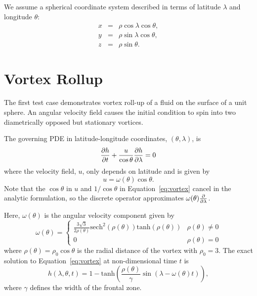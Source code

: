 \documentclass{report}
\begin{document}
We assume a spherical coordinate system described in terms of latitude $\lambda$ and longitude $\theta$:
\begin{eqnarray*} 
x & = & \rho \cos \lambda \cos \theta, 	\\
y & = & \rho \sin \lambda \cos \theta, 		\\
z & = & \rho \sin \theta.		
\end{eqnarray*}


\section{Vortex Rollup}
\label{sec:vortex_rollup}

The first test case demonstrates vortex roll-up of a fluid on the surface of a unit sphere. An angular velocity field causes the initial condition to spin into two diametrically opposed but stationary vortices.

The governing PDE in latitude-longitude coordinates, $(\theta,\lambda)$, is
\begin{equation}
\frac{\partial h}{\partial t} + \frac{u}{\cos \theta} \frac{\partial h}{\partial \lambda} = 0
\label{eq:vortex}
\end{equation}
where the velocity field, $u$, only depends on latitude and is given by
\begin{equation*}
u  = \omega(\theta) \cos \theta.
\end{equation*}
Note that the $\cos \theta$ in $u$ and $1/\cos{\theta}$ in Equation~\ref{eq:vortex} cancel in the analytic formulation, so the discrete operator approximates $\omega(\theta) \frac{\partial }{\partial \lambda}$. 

Here, $\omega(\theta)$ is the angular velocity component given by
\begin{equation*}
\omega(\theta) =
\begin{cases}
\frac{3\sqrt{3}}{2 \rho(\theta)} \mathrm{sech}^{2}(\rho(\theta)) \mathrm{tanh}(\rho(\theta)) & \rho(\theta) \neq 0 \\
0 & \rho(\theta) = 0
\end{cases}
\end{equation*}
where $\rho(\theta) = \rho_0 \cos \theta$ is the radial distance of the vortex with $\rho_0=3$. The exact solution to Equation~\ref{eq:vortex} at non-dimensional time $t$ is
\begin{equation*}
h(\lambda, \theta, t) = 1 - \mathrm{tanh}\left( \frac{\rho(\theta)}{\gamma} \sin(\lambda - \omega(\theta) t) \right),
\end{equation*}
where $\gamma$ defines the width of the frontal zone.
\end{document}
